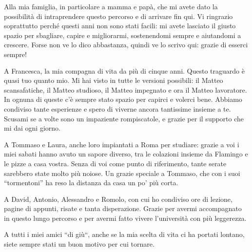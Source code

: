 \documentclass[]{sapthesis}
\begin{document}
{\setlength{\parindent}{0pt}
\setlength{\parskip}{1.2em}

Alla mia famiglia, in particolare a mamma e papà, che mi avete dato la possibilità di intraprendere questo percorso e di arrivare fin qui. Vi ringrazio soprattutto perché questi anni non sono stati facili: mi avete lasciato il giusto spazio per sbagliare, capire e migliorarmi, sostenendomi sempre e aiutandomi a crescere. Forse non ve lo dico abbastanza, quindi ve lo scrivo qui: grazie di esserci sempre!

A Francesca, la mia compagna di vita da più di cinque anni. Questo traguardo è quasi tuo quanto mio. Mi hai visto in tutte le versioni possibili: il Matteo scansafatiche, il Matteo studioso, il Matteo impegnato e ora il Matteo lavoratore. In ognuna di queste c'è sempre stato spazio per capirci e volerci bene. Abbiamo condiviso tante esperienze e spero di viverne ancora tantissime insieme a te. Scusami se a volte sono un impaziente rompiscatole, e grazie per il supporto che mi dai ogni giorno.

A Tommaso e Laura, anche loro impiantati a Roma per studiare: grazie a voi i miei sabati hanno avuto un sapore diverso, tra le colazioni insieme da Flamingo e le pizze a casa vostra. Senza di voi come punto di riferimento, tante serate sarebbero state molto più noiose. Un grazie speciale a Tommaso, che con i suoi ``tormentoni'' ha reso la distanza da casa un po' più corta.

A David, Antonio, Alessandro e Romolo, con cui ho condiviso ore di lezione, pagine di appunti, risate e tanta disperazione. Grazie per avermi accompagnato in questo lungo percorso e per avermi fatto vivere l'università con più leggerezza.

A tutti i miei amici ``di giù``, anche se la mia scelta di vita ci ha portati lontano, siete sempre stati un buon motivo per cui tornare.

}
\end{document}
